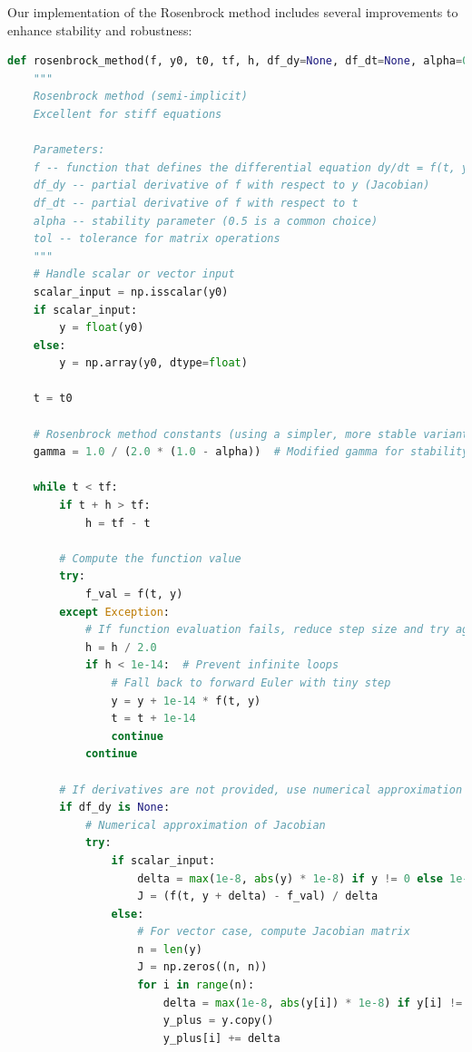 \documentclass[11pt,a4paper]{article}
\begin{document}
Our implementation of the Rosenbrock method includes several improvements to enhance stability and robustness:

\begin{lstlisting}[language=Python, caption=Improved Rosenbrock Method Implementation]
def rosenbrock_method(f, y0, t0, tf, h, df_dy=None, df_dt=None, alpha=0.5, tol=1e-6):
    """
    Rosenbrock method (semi-implicit)
    Excellent for stiff equations
    
    Parameters:
    f -- function that defines the differential equation dy/dt = f(t, y)
    df_dy -- partial derivative of f with respect to y (Jacobian)
    df_dt -- partial derivative of f with respect to t
    alpha -- stability parameter (0.5 is a common choice)
    tol -- tolerance for matrix operations
    """
    # Handle scalar or vector input
    scalar_input = np.isscalar(y0)
    if scalar_input:
        y = float(y0)
    else:
        y = np.array(y0, dtype=float)
    
    t = t0
    
    # Rosenbrock method constants (using a simpler, more stable variant)
    gamma = 1.0 / (2.0 * (1.0 - alpha))  # Modified gamma for stability
    
    while t < tf:
        if t + h > tf:
            h = tf - t
        
        # Compute the function value
        try:
            f_val = f(t, y)
        except Exception:
            # If function evaluation fails, reduce step size and try again
            h = h / 2.0
            if h < 1e-14:  # Prevent infinite loops
                # Fall back to forward Euler with tiny step
                y = y + 1e-14 * f(t, y)
                t = t + 1e-14
                continue
            continue
        
        # If derivatives are not provided, use numerical approximation
        if df_dy is None:
            # Numerical approximation of Jacobian
            try:
                if scalar_input:
                    delta = max(1e-8, abs(y) * 1e-8) if y != 0 else 1e-8
                    J = (f(t, y + delta) - f_val) / delta
                else:
                    # For vector case, compute Jacobian matrix
                    n = len(y)
                    J = np.zeros((n, n))
                    for i in range(n):
                        delta = max(1e-8, abs(y[i]) * 1e-8) if y[i] != 0 else 1e-8
                        y_plus = y.copy()
                        y_plus[i] += delta
                        

\end{lstlisting}
\end{document}
